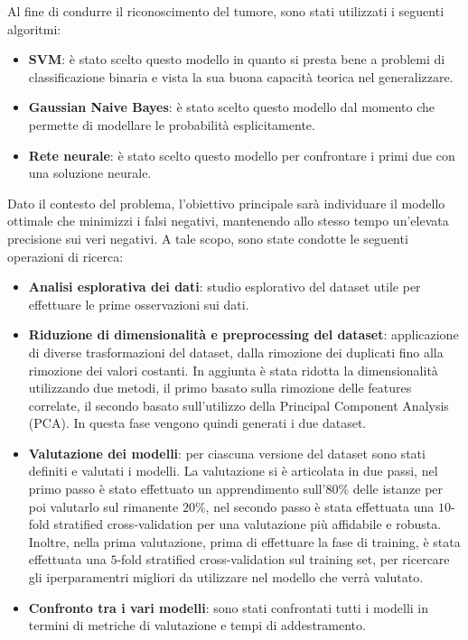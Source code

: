 Al fine di condurre il riconoscimento del tumore, sono stati utilizzati i
seguenti algoritmi:
\begin{itemize}
      \item \textbf{SVM}: è stato scelto questo modello in quanto si presta bene
            a problemi di classificazione binaria e vista la sua buona capacità
            teorica nel generalizzare.
      \item \textbf{Gaussian Naive Bayes}: è stato scelto questo modello dal
            momento che permette di modellare le probabilità esplicitamente.
      \item \textbf{Rete neurale}: è stato scelto questo modello per confrontare
            i primi due con una soluzione neurale.
\end{itemize}
Dato il contesto del problema, l'obiettivo principale sarà individuare il modello
ottimale che minimizzi i falsi negativi, mantenendo allo stesso tempo un'elevata
precisione sui veri negativi. A tale scopo, sono state condotte le seguenti
operazioni di ricerca:
\begin{itemize}
      \item \textbf{Analisi esplorativa dei dati}: studio esplorativo del dataset
            utile per effettuare le prime osservazioni sui dati.
      \item \textbf{Riduzione di dimensionalità e preprocessing del dataset}:
            applicazione di diverse trasformazioni del dataset, dalla rimozione
            dei duplicati fino alla rimozione dei valori costanti. In aggiunta è
            stata ridotta la dimensionalità utilizzando due metodi, il primo
            basato sulla rimozione delle features correlate, il secondo basato
            sull'utilizzo della Principal Component Analysis (PCA). In questa fase
            vengono quindi generati i due dataset.
      \item \textbf{Valutazione dei modelli}: per ciascuna versione
            del dataset sono stati definiti e valutati i modelli. La valutazione
            si è articolata in due passi, nel primo passo è stato effettuato un 
            apprendimento sull'$80\%$ delle istanze per poi valutarlo sul rimanente $20\%$, 
            nel secondo passo è stata effettuata una $10$-fold stratified cross-validation 
            per una valutazione più affidabile e robusta.
            Inoltre, nella prima valutazione, prima di effettuare la fase di training,
            è stata effettuata una $5$-fold stratified cross-validation sul training set, per
            ricercare gli iperparamentri migliori da utilizzare nel modello che
            verrà valutato.
      \item \textbf{Confronto tra i vari modelli}: sono stati confrontati tutti
            i modelli in termini di metriche di valutazione e tempi di addestramento.
\end{itemize}
